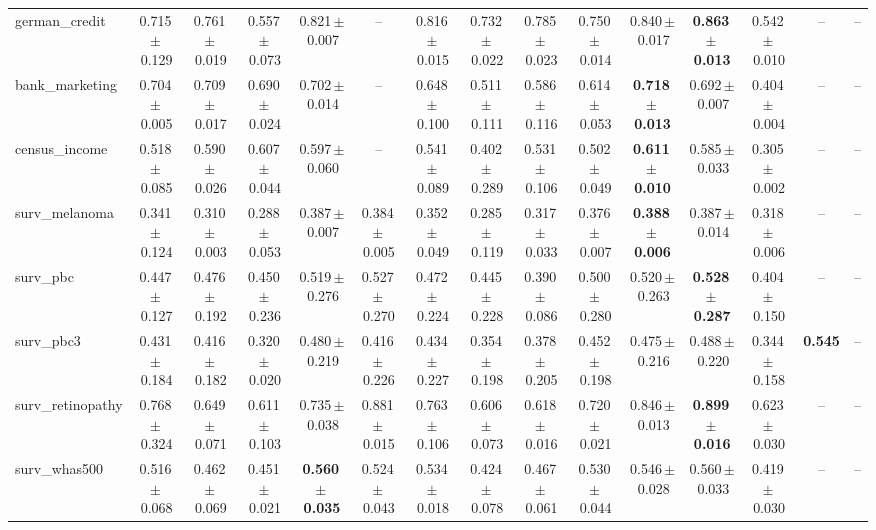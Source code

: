 \documentclass[8pt]{extarticle}
\begin{document}
\begin{longtable}{l*{14}{c}}
german\_credit & 0.715\,$\pm$\,0.129 & 0.761\,$\pm$\,0.019 & 0.557\,$\pm$\,0.073 & 0.821\,$\pm$\,0.007 & -- & 0.816\,$\pm$\,0.015 & 0.732\,$\pm$\,0.022 & 0.785\,$\pm$\,0.023 & 0.750\,$\pm$\,0.014 & 0.840\,$\pm$\,0.017 & \textbf{0.863\,$\pm$\,0.013} & 0.542\,$\pm$\,0.010 & -- & -- \\
bank\_marketing & 0.704\,$\pm$\,0.005 & 0.709\,$\pm$\,0.017 & 0.690\,$\pm$\,0.024 & 0.702\,$\pm$\,0.014 & -- & 0.648\,$\pm$\,0.100 & 0.511\,$\pm$\,0.111 & 0.586\,$\pm$\,0.116 & 0.614\,$\pm$\,0.053 & \textbf{0.718\,$\pm$\,0.013} & 0.692\,$\pm$\,0.007 & 0.404\,$\pm$\,0.004 & -- & -- \\
census\_income & 0.518\,$\pm$\,0.085 & 0.590\,$\pm$\,0.026 & 0.607\,$\pm$\,0.044 & 0.597\,$\pm$\,0.060 & -- & 0.541\,$\pm$\,0.089 & 0.402\,$\pm$\,0.289 & 0.531\,$\pm$\,0.106 & 0.502\,$\pm$\,0.049 & \textbf{0.611\,$\pm$\,0.010} & 0.585\,$\pm$\,0.033 & 0.305\,$\pm$\,0.002 & -- & -- \\
surv\_melanoma & 0.341\,$\pm$\,0.124 & 0.310\,$\pm$\,0.003 & 0.288\,$\pm$\,0.053 & 0.387\,$\pm$\,0.007 & 0.384\,$\pm$\,0.005 & 0.352\,$\pm$\,0.049 & 0.285\,$\pm$\,0.119 & 0.317\,$\pm$\,0.033 & 0.376\,$\pm$\,0.007 & \textbf{0.388\,$\pm$\,0.006} & 0.387\,$\pm$\,0.014 & 0.318\,$\pm$\,0.006 & -- & -- \\
surv\_pbc & 0.447\,$\pm$\,0.127 & 0.476\,$\pm$\,0.192 & 0.450\,$\pm$\,0.236 & 0.519\,$\pm$\,0.276 & 0.527\,$\pm$\,0.270 & 0.472\,$\pm$\,0.224 & 0.445\,$\pm$\,0.228 & 0.390\,$\pm$\,0.086 & 0.500\,$\pm$\,0.280 & 0.520\,$\pm$\,0.263 & \textbf{0.528\,$\pm$\,0.287} & 0.404\,$\pm$\,0.150 & -- & -- \\
surv\_pbc3 & 0.431\,$\pm$\,0.184 & 0.416\,$\pm$\,0.182 & 0.320\,$\pm$\,0.020 & 0.480\,$\pm$\,0.219 & 0.416\,$\pm$\,0.226 & 0.434\,$\pm$\,0.227 & 0.354\,$\pm$\,0.198 & 0.378\,$\pm$\,0.205 & 0.452\,$\pm$\,0.198 & 0.475\,$\pm$\,0.216 & 0.488\,$\pm$\,0.220 & 0.344\,$\pm$\,0.158 & \textbf{0.545} & -- \\
surv\_retinopathy & 0.768\,$\pm$\,0.324 & 0.649\,$\pm$\,0.071 & 0.611\,$\pm$\,0.103 & 0.735\,$\pm$\,0.038 & 0.881\,$\pm$\,0.015 & 0.763\,$\pm$\,0.106 & 0.606\,$\pm$\,0.073 & 0.618\,$\pm$\,0.016 & 0.720\,$\pm$\,0.021 & 0.846\,$\pm$\,0.013 & \textbf{0.899\,$\pm$\,0.016} & 0.623\,$\pm$\,0.030 & -- & -- \\
surv\_whas500 & 0.516\,$\pm$\,0.068 & 0.462\,$\pm$\,0.069 & 0.451\,$\pm$\,0.021 & \textbf{0.560\,$\pm$\,0.035} & 0.524\,$\pm$\,0.043 & 0.534\,$\pm$\,0.018 & 0.424\,$\pm$\,0.078 & 0.467\,$\pm$\,0.061 & 0.530\,$\pm$\,0.044 & 0.546\,$\pm$\,0.028 & 0.560\,$\pm$\,0.033 & 0.419\,$\pm$\,0.030 & -- & -- \\

\end{longtable}
\end{document}

